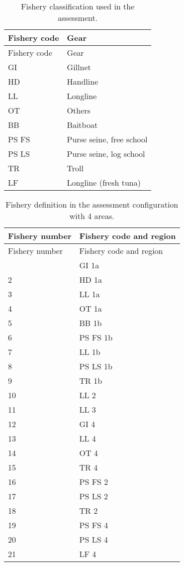 \documentclass[
]{scrartcl}
\begin{document}
\newpage{}

\begin{longtable}[]{@{}ll@{}}
\caption{Fishery classification used in the
assessment.}\label{tbl-fishery-codes}\tabularnewline
\toprule\noalign{}
Fishery code & Gear \\
\midrule\noalign{}
\endfirsthead
\toprule\noalign{}
Fishery code & Gear \\
\midrule\noalign{}
\endhead
\bottomrule\noalign{}
\endlastfoot
GI & Gillnet \\
HD & Handline \\
LL & Longline \\
OT & Others \\
BB & Baitboat \\
PS FS & Purse seine, free school \\
PS LS & Purse seine, log school \\
TR & Troll \\
LF & Longline (fresh tuna) \\
\end{longtable}

\newpage{}

\begin{longtable}[]{@{}ll@{}}
\caption{Fishery definition in the assessment configuration with 4
areas.}\label{tbl-fleet-4Aconfig}\tabularnewline
\toprule\noalign{}
Fishery number & Fishery code and region \\
\midrule\noalign{}
\endfirsthead
\toprule\noalign{}
Fishery number & Fishery code and region \\
\midrule\noalign{}
\endhead
\bottomrule\noalign{}
\endlastfoot
1 & GI 1a \\
2 & HD 1a \\
3 & LL 1a \\
4 & OT 1a \\
5 & BB 1b \\
6 & PS FS 1b \\
7 & LL 1b \\
8 & PS LS 1b \\
9 & TR 1b \\
10 & LL 2 \\
11 & LL 3 \\
12 & GI 4 \\
13 & LL 4 \\
14 & OT 4 \\
15 & TR 4 \\
16 & PS FS 2 \\
17 & PS LS 2 \\
18 & TR 2 \\
19 & PS FS 4 \\
20 & PS LS 4 \\
21 & LF 4 \\
\end{longtable}
\end{document}
